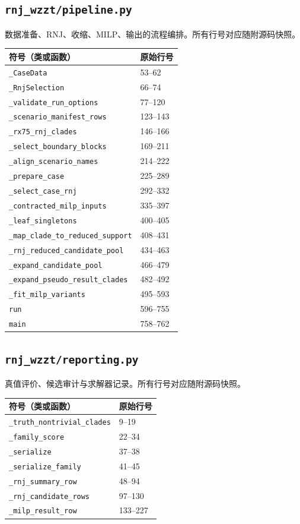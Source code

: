 \subsection{\texorpdfstring{\nolinkurl{rnj_wzzt/pipeline.py}}{rnj\_wzzt/pipeline.py}}\label{module:pipeline}
数据准备、RNJ、收缩、MILP、输出的流程编排。所有行号对应随附源码快照。
\begin{longtable}{P{0.73\textwidth}P{0.18\textwidth}}\toprule 符号（类或函数） & 原始行号\\\midrule\endhead
\nolinkurl{_CaseData} & 53--62 \\
\nolinkurl{_RnjSelection} & 66--74 \\
\nolinkurl{_validate_run_options} & 77--120 \\
\nolinkurl{_scenario_manifest_rows} & 123--143 \\
\nolinkurl{_rx75_rnj_clades} & 146--166 \\
\nolinkurl{_select_boundary_blocks} & 169--211 \\
\nolinkurl{_align_scenario_names} & 214--222 \\
\nolinkurl{_prepare_case} & 225--289 \\
\nolinkurl{_select_case_rnj} & 292--332 \\
\nolinkurl{_contracted_milp_inputs} & 335--397 \\
\nolinkurl{_leaf_singletons} & 400--405 \\
\nolinkurl{_map_clade_to_reduced_support} & 408--431 \\
\nolinkurl{_rnj_reduced_candidate_pool} & 434--463 \\
\nolinkurl{_expand_candidate_pool} & 466--479 \\
\nolinkurl{_expand_pseudo_result_clades} & 482--492 \\
\nolinkurl{_fit_milp_variants} & 495--593 \\
\nolinkurl{run} & 596--755 \\
\nolinkurl{main} & 758--762 \\
\bottomrule\end{longtable}
\subsection{\texorpdfstring{\nolinkurl{rnj_wzzt/reporting.py}}{rnj\_wzzt/reporting.py}}\label{module:reporting}
真值评价、候选审计与求解器记录。所有行号对应随附源码快照。
\begin{longtable}{P{0.73\textwidth}P{0.18\textwidth}}\toprule 符号（类或函数） & 原始行号\\\midrule\endhead
\nolinkurl{_truth_nontrivial_clades} & 9--19 \\
\nolinkurl{_family_score} & 22--34 \\
\nolinkurl{_serialize} & 37--38 \\
\nolinkurl{_serialize_family} & 41--45 \\
\nolinkurl{_rnj_summary_row} & 48--94 \\
\nolinkurl{_rnj_candidate_rows} & 97--130 \\
\nolinkurl{_milp_result_row} & 133--227 \\
\bottomrule\end{longtable}
